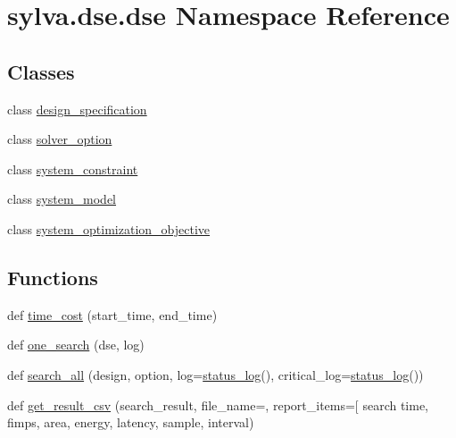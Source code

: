 \hypertarget{namespacesylva_1_1dse_1_1dse}{}\section{sylva.\+dse.\+dse Namespace Reference}
\label{namespacesylva_1_1dse_1_1dse}
\subsection*{Classes}
\begin{DoxyCompactItemize}
\item 
class \hyperlink{classsylva_1_1dse_1_1dse_1_1design__specification}{design\+\_\+specification}
\item 
class \hyperlink{classsylva_1_1dse_1_1dse_1_1solver__option}{solver\+\_\+option}
\item 
class \hyperlink{classsylva_1_1dse_1_1dse_1_1system__constraint}{system\+\_\+constraint}
\item 
class \hyperlink{classsylva_1_1dse_1_1dse_1_1system__model}{system\+\_\+model}
\item 
class \hyperlink{classsylva_1_1dse_1_1dse_1_1system__optimization__objective}{system\+\_\+optimization\+\_\+objective}
\end{DoxyCompactItemize}
\subsection*{Functions}
\begin{DoxyCompactItemize}
\item 
def \hyperlink{namespacesylva_1_1dse_1_1dse_acf83688e18cc0859483b4c9bb70183fd}{time\+\_\+cost} (start\+\_\+time, end\+\_\+time)
\item 
def \hyperlink{namespacesylva_1_1dse_1_1dse_a27653b05dda8ab9dab8aa948db5b860a}{one\+\_\+search} (dse, log)
\item 
def \hyperlink{namespacesylva_1_1dse_1_1dse_ab6e885c27f1c1dbe29468f3d931f1a63}{search\+\_\+all} (design, option, log=\hyperlink{classsylva_1_1misc_1_1util_1_1status__log}{status\+\_\+log}(), critical\+\_\+log=\hyperlink{classsylva_1_1misc_1_1util_1_1status__log}{status\+\_\+log}())
\item 
def \hyperlink{namespacesylva_1_1dse_1_1dse_afcf62d3580889d2c99cb16694f738e02}{get\+\_\+result\+\_\+csv} (search\+\_\+result, file\+\_\+name=\textquotesingle{}\textquotesingle{}, report\+\_\+items=\mbox{[} \textquotesingle{}search time\textquotesingle{}, fimps, area, energy, latency, sample, interval)
\end{DoxyCompactItemize}
